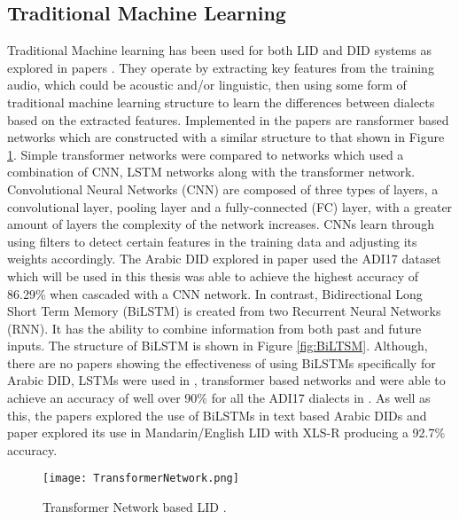 \subsection{Traditional Machine Learning}\label{sec:tradML}
Traditional Machine learning has been used for both LID and DID systems as explored in papers \cite{albadr_spoken_2018,lin_transformer-based_2020,miao_lstm-tdnn_2019,miao_new_2019,revay_multiclass_2019,shon_convolutional_2018,tjandra_improved_2021}. 
They operate by extracting key features from the training audio, which could be acoustic and/or linguistic, then using some form 
of traditional machine learning structure to learn the differences between dialects based on the extracted features. Implemented in the papers \cite{lin_transformer-based_2020,miao_lstm-tdnn_2019,miao_new_2019,shon_convolutional_2018}
are ransformer based networks which are constructed with a similar structure to that shown in Figure \ref{fig:transformerLID}. Simple transformer 
networks were compared to networks which used a combination of CNN, LSTM networks along with the transformer network. Convolutional Neural Networks (CNN)
are composed of three types of layers, a convolutional layer, pooling layer and a fully-connected (FC) layer, with a greater amount of layers the complexity of 
the network increases. CNNs learn through using filters to detect certain features in the training data and adjusting its weights accordingly. The Arabic DID explored in paper \cite{liu_roberta_2019}
used the ADI17 dataset which will be used in this thesis was able to achieve the highest accuracy of 86.29\% when cascaded with a CNN network.  
In contrast, Bidirectional Long Short Term Memory (BiLSTM) is created from two Recurrent Neural Networks (RNN). It has the ability to combine information from both past and future inputs. 
The structure of BiLSTM is shown in Figure \ref{fig:BiLTSM}. 
Although, there are no papers showing the effectiveness of using BiLSTMs specifically for Arabic DID, LSTMs were used in \cite{miao_lstm-tdnn_2019,miao_new_2019}, transformer based networks 
and were able to achieve an accuracy of well over 90\% for all the ADI17 dialects in \cite{miao_new_2019}. As well as this, the papers \cite{samih_neural_2017,zaidan_arabic_2014} explored the use of BiLSTMs in text based Arabic DIDs and paper \cite{tseng_mandarin-english_2021} explored
its use in Mandarin/English LID with XLS-R producing a 92.7\% accuracy.

\begin{figure}[h!]
    \centering
    \texttt{[image: TransformerNetwork.png]}
    \caption{Transformer Network based LID \cite{miao_new_2019}.}
    \label{fig:transformerLID}
\end{figure}

